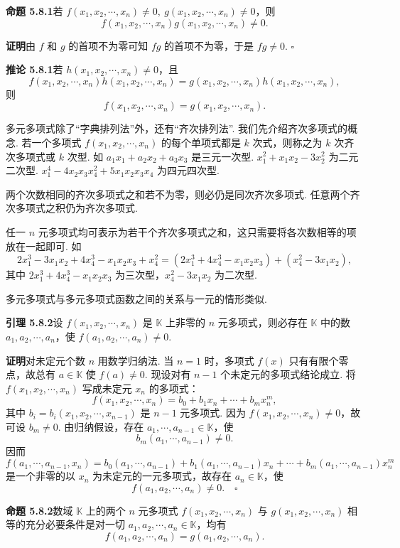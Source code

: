 \documentclass[UTF8, 12pt, fontset=fandol, oneside]{ctexart}
\begin{document}
\noindent\textbf{命题 5.8.1}\quad 若 $f(x_1,x_2,\cdots,x_n)\neq 0,\ g(x_1,x_2,\cdots,x_n)\neq 0$，则
\[
f(x_1,x_2,\cdots,x_n)g(x_1,x_2,\cdots,x_n)\neq 0.
\]

\noindent\textbf{证明}\quad 由 $f$ 和 $g$ 的首项不为零可知 $fg$ 的首项不为零，于是 $fg\neq 0$. $\square$

\noindent\textbf{推论 5.8.1}\quad 若 $h(x_1,x_2,\cdots,x_n)\neq 0$，且
\[
f(x_1,x_2,\cdots,x_n)h(x_1,x_2,\cdots,x_n)=g(x_1,x_2,\cdots,x_n)h(x_1,x_2,\cdots,x_n),
\]
则
\[
f(x_1,x_2,\cdots,x_n)=g(x_1,x_2,\cdots,x_n).
\]

多元多项式除了“字典排列法”外，还有“齐次排列法”. 我们先介绍齐次多项式的概念. 若一个多项式 $f(x_1,x_2,\cdots,x_n)$ 的每个单项式都是 $k$ 次式，则称之为 $k$ 次齐次多项式或 $k$ 次型. 如 $a_1x_1+a_2x_2+a_3x_3$ 是三元一次型. $x_1^2+x_1x_2-3x_2^2$ 为二元二次型. $x_1^4-4x_2x_3x_4^2+5x_1x_2x_3x_4$ 为四元四次型.

两个次数相同的齐次多项式之和若不为零，则必仍是同次齐次多项式. 任意两个齐次多项式之积仍为齐次多项式.

任一 $n$ 元多项式均可表示为若干个齐次多项式之和，这只需要将各次数相等的项放在一起即可. 如
\[
2x_1^3-3x_1x_2+4x_4^3-x_1x_2x_3+x_4^2=(2x_1^3+4x_4^3-x_1x_2x_3)+(x_4^2-3x_1x_2),
\]
其中 $2x_1^3+4x_4^3-x_1x_2x_3$ 为三次型，$x_4^2-3x_1x_2$ 为二次型.

多元多项式与多元多项式函数之间的关系与一元的情形类似.

\noindent\textbf{引理 5.8.2}\quad 设 $f(x_1,x_2,\cdots,x_n)$ 是 $\mathbb{K}$ 上非零的 $n$ 元多项式，则必存在 $\mathbb{K}$ 中的数 $a_1,a_2,\cdots,a_n$，使 $f(a_1,a_2,\cdots,a_n)\neq 0$.

\noindent\textbf{证明}\quad 对未定元个数 $n$ 用数学归纳法. 当 $n=1$ 时，多项式 $f(x)$ 只有有限个零点，故总有 $a\in\mathbb{K}$ 使 $f(a)\neq 0$. 现设对有 $n-1$ 个未定元的多项式结论成立. 将 $f(x_1,x_2,\cdots,x_n)$ 写成未定元 $x_n$ 的多项式：
\[
f(x_1,x_2,\cdots,x_n)=b_0+b_1x_n+\cdots+b_mx_n^m,
\]
其中 $b_i=b_i(x_1,x_2,\cdots,x_{n-1})$ 是 $n-1$ 元多项式. 因为 $f(x_1,x_2,\cdots,x_n)\neq 0$，故可设 $b_m\neq 0$. 由归纳假设，存在 $a_1,\cdots,a_{n-1}\in\mathbb{K}$，使
\[
b_m(a_1,\cdots,a_{n-1})\neq 0.
\]
因而
\[
f(a_1,\cdots,a_{n-1},x_n)=b_0(a_1,\cdots,a_{n-1})+b_1(a_1,\cdots,a_{n-1})x_n+\cdots+b_m(a_1,\cdots,a_{n-1})x_n^m
\]
是一个非零的以 $x_n$ 为未定元的一元多项式，故存在 $a_n\in\mathbb{K}$，使
\[
f(a_1,a_2,\cdots,a_n)\neq 0.\quad \square
\]

\noindent\textbf{命题 5.8.2}\quad 数域 $\mathbb{K}$ 上的两个 $n$ 元多项式 $f(x_1,x_2,\cdots,x_n)$ 与 $g(x_1,x_2,\cdots,x_n)$ 相等的充分必要条件是对一切 $a_1,a_2,\cdots,a_n\in\mathbb{K}$，均有
\[
f(a_1,a_2,\cdots,a_n)=g(a_1,a_2,\cdots,a_n).
\]
\end{document}
